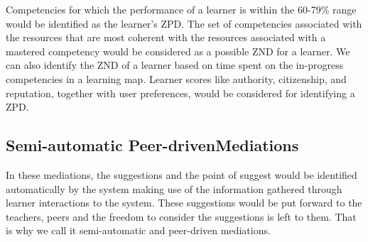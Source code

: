 \begin{multicols}{2}
Competencies for which the performance of a learner is within the 60-79\% range would be identified as the learner’s ZPD. The set of competencies associated with the resources that are most coherent with the resources associated with a mastered competency would be considered as a possible ZND for a learner. We can also identify the ZND of a learner based on time spent on the in-progress competencies in a learning map. Learner scores like authority, citizenship, and reputation, together with user preferences, would be considered for identifying a ZPD.

\subsection{Semi-automatic Peer-driven\hfill\break Mediations}

In these mediations, the suggestions and the point of suggest would be identified automatically by the system making use of the information gathered through learner interactions to the system. These suggestions would be put forward to the teachers, peers and the freedom to consider the suggestions is left to them. That is why we call it semi-automatic and peer-driven mediations.


\end{multicols}
